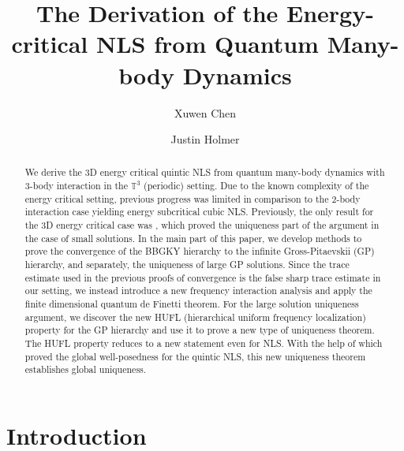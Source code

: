 \documentclass[12pt,letterpaper,leqno]{amsart}
\theoremstyle{plain}
\numberwithin{equation}{section}
\numberwithin{theorem}{section}
\numberwithin{proposition}{section}
\numberwithin{lemma}{section}
\numberwithin{corollary}{section}
\begin{document}
\title[3D Quintic NLS as Mean-field Limit]{The Derivation of the
Energy-critical NLS from Quantum Many-body Dynamics}
\author{Xuwen Chen}
\address{Department of Mathematics, University of Rochester, Rochester, NY
14627}
\author{Justin Holmer}
\address{Department of Mathematics, Brown University, 151 Thayer Street,
Providence, RI 02912}

\begin{abstract}
We derive the 3D energy critical quintic NLS from quantum many-body dynamics
with $3$-body interaction in the $\mathbb{T}^{3}$ (periodic) setting. Due to
the known complexity of the energy critical setting, previous progress was
limited in comparison to the $2$-body interaction case yielding energy
subcritical cubic NLS. Previously, the only result for the 3D energy
critical case was \cite{HTX}, which proved the uniqueness part of the
argument in the case of small solutions. In the main part of this paper, we
develop methods to prove the convergence of the BBGKY hierarchy to the
infinite Gross-Pitaevskii (GP) hierarchy, and separately, the uniqueness of
large GP solutions. Since the trace estimate used in the previous proofs of
convergence is the false sharp trace estimate in our setting, we instead
introduce a new frequency interaction analysis and apply the finite
dimensional quantum de Finetti theorem. For the large solution uniqueness
argument, we discover the new HUFL (hierarchical uniform frequency
localization) property for the GP hierarchy and use it to prove a new type
of uniqueness theorem. The HUFL property reduces to a new statement even for
NLS. With the help of \cite{CKSTT,IP} which proved the global well-posedness
for the quintic NLS, this new uniqueness theorem establishes global
uniqueness.
\end{abstract}

\maketitle
\tableofcontents

\section{Introduction\label{sec:Introduction}}
\end{document}
